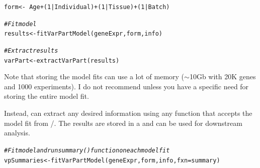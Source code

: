 \documentclass[12pt]{article}\usepackage[]{graphicx}\usepackage[]{xcolor}
\newcommand{\hlnum}[1]{\textcolor[rgb]{0.816,0.125,0.439}{#1}}%
\newcommand{\hlcom}[1]{\textcolor[rgb]{0.502,0.502,0.502}{\textit{#1}}}%
\newcommand{\hlopt}[1]{\textcolor[rgb]{0,0,0}{#1}}%
\newcommand{\hlstd}[1]{\textcolor[rgb]{0.251,0.251,0.251}{#1}}%
\newcommand{\hlkwb}[1]{\textcolor[rgb]{0,0,0}{#1}}%
\newcommand{\hlkwc}[1]{\textcolor[rgb]{0.251,0.251,0.251}{#1}}%
\newcommand{\hlkwd}[1]{\textcolor[rgb]{0.878,0.439,0.125}{#1}}%
\newenvironment{knitrout}{}{} %
\begin{document}
\begin{knitrout}
\color{fgcolor}\begin{kframe}
\begin{alltt}
\hlstd{form} \hlkwb{<-} \hlopt{~} \hlstd{Age} \hlopt{+} \hlstd{(}\hlnum{1} \hlopt{|} \hlstd{Individual)} \hlopt{+} \hlstd{(}\hlnum{1} \hlopt{|} \hlstd{Tissue)} \hlopt{+} \hlstd{(}\hlnum{1} \hlopt{|} \hlstd{Batch)}

\hlcom{# Fit model}
\hlstd{results} \hlkwb{<-} \hlkwd{fitVarPartModel}\hlstd{(geneExpr, form, info)}

\hlcom{# Extract results}
\hlstd{varPart} \hlkwb{<-} \hlkwd{extractVarPart}\hlstd{(results)}
\end{alltt}
\end{kframe}
\end{knitrout}

Note that storing the model fits can use a lot of memory ($\sim$10Gb with 20K genes and 1000 experiments). I do not recommend unless you have a specific need for storing the entire model fit.

Instead,  can extract any desired information using any function that accepts the model fit from /.  The results are stored in a  and can be used for downstream analysis.

\begin{knitrout}
\color{fgcolor}\begin{kframe}
\begin{alltt}
\hlcom{# Fit model and run summary() function on each model fit}
\hlstd{vpSummaries} \hlkwb{<-} \hlkwd{fitVarPartModel}\hlstd{(geneExpr, form, info,} \hlkwc{fxn} \hlstd{= summary)}
\end{alltt}
\end{kframe}
\end{knitrout}
\end{document}
